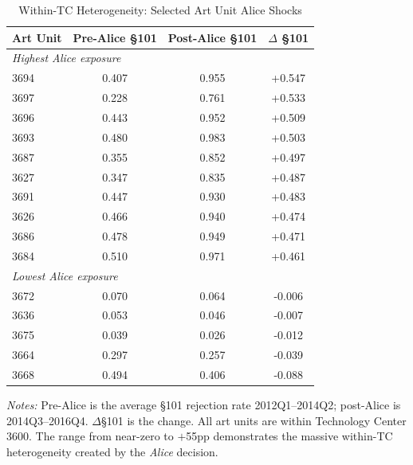 \begin{table}[H]
\centering
\caption{Within-TC Heterogeneity: Selected Art Unit Alice Shocks}
\label{tab:heterogeneity}
\begin{threeparttable}
\begin{tabular}{lccc}
\toprule
Art Unit & Pre-Alice \S101 & Post-Alice \S101 & $\Delta$ \S101 \\
\midrule
\multicolumn{4}{l}{\textit{Highest Alice exposure}} \\
  3694 & 0.407 & 0.955 & +0.547 \\
  3697 & 0.228 & 0.761 & +0.533 \\
  3696 & 0.443 & 0.952 & +0.509 \\
  3693 & 0.480 & 0.983 & +0.503 \\
  3687 & 0.355 & 0.852 & +0.497 \\
  3627 & 0.347 & 0.835 & +0.487 \\
  3691 & 0.447 & 0.930 & +0.483 \\
  3626 & 0.466 & 0.940 & +0.474 \\
  3686 & 0.478 & 0.949 & +0.471 \\
  3684 & 0.510 & 0.971 & +0.461 \\
\midrule
\multicolumn{4}{l}{\textit{Lowest Alice exposure}} \\
  3672 & 0.070 & 0.064 & -0.006 \\
  3636 & 0.053 & 0.046 & -0.007 \\
  3675 & 0.039 & 0.026 & -0.012 \\
  3664 & 0.297 & 0.257 & -0.039 \\
  3668 & 0.494 & 0.406 & -0.088 \\
\bottomrule
\end{tabular}
\begin{tablenotes}[flushleft]
\small
\item \textit{Notes:} Pre-Alice is the average \S101 rejection rate 2012Q1--2014Q2; post-Alice is 2014Q3--2016Q4. $\Delta$\S101 is the change. All art units are within Technology Center 3600. The range from near-zero to $+$55pp demonstrates the massive within-TC heterogeneity created by the \textit{Alice} decision.
\end{tablenotes}
\end{threeparttable}
\end{table}
